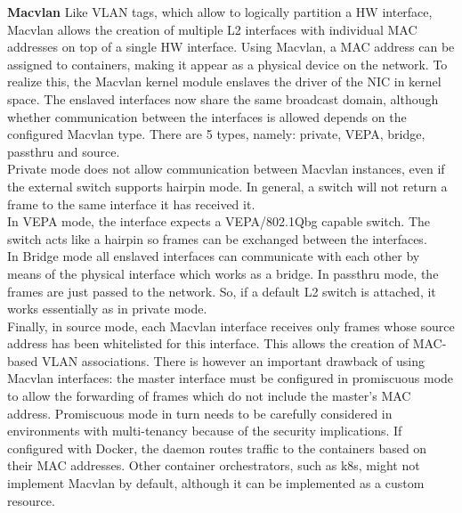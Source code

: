 \documentclass[conference]{IEEEtran}
\begin{document}
\noindent\textbf{Macvlan}  \hspace{0.2cm} Like VLAN tags, which allow to logically partition a HW interface, Macvlan allows the creation of multiple L2 interfaces with individual MAC addresses on top of a single HW interface. Using Macvlan, a MAC address can be assigned to containers, making it appear as a physical device on the network. To realize this, the Macvlan kernel module enslaves the driver of the NIC in kernel space. The enslaved interfaces now share the same broadcast domain, although whether communication between the interfaces is allowed depends on the configured Macvlan type. There are 5 types, namely: private, VEPA, bridge, passthru and source.\\
Private mode does not allow communication between Macvlan instances, even if the external switch supports hairpin mode. In general, a switch will not return a frame to the same interface it has received it.\\
In VEPA mode, the interface expects a VEPA/802.1Qbg capable switch. The switch acts like a hairpin so frames can be exchanged between the interfaces.\\
In Bridge mode all enslaved interfaces can communicate with each other by means of the physical interface which works as a bridge. In passthru mode, the frames are just passed to the network. So, if a default L2 switch is attached, it works essentially as in private mode.\\
Finally, in source mode, each Macvlan interface receives only frames whose source address has been whitelisted for this interface. This allows the creation of MAC-based VLAN associations.
There is however an important drawback of using Macvlan interfaces: the master interface must be configured in promiscuous mode to allow the forwarding of frames which do not include the master's MAC address. Promiscuous mode in turn needs to be carefully considered in environments with multi-tenancy because of the security implications.
If configured with Docker, the daemon routes traffic to the containers based on their MAC addresses. Other container orchestrators, such as k8s, might not implement Macvlan by default, although it can be implemented as a custom resource.
\end{document}
